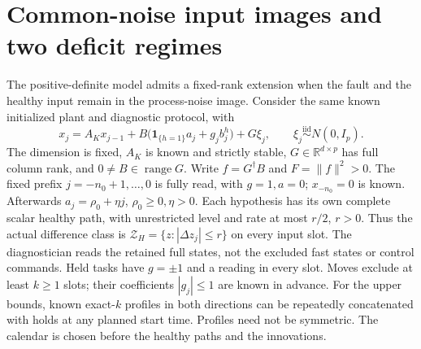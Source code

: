 \section{Common-noise input images and two deficit regimes}
\label{m2sreg:section}

The positive-definite model admits a fixed-rank extension when the fault
and the healthy input remain in the process-noise image. Consider the
same known initialized plant and diagnostic protocol, with
\begin{equation}\label{m2sreg:plant}
x_j=A_Kx_{j-1}+B\bigl(\mathbf1_{\{h=1\}}a_j+g_jb_j^h\bigr)+G\xi_j,
\qquad \xi_j\overset{\mathrm{iid}}{\sim}N(0,I_p).
\end{equation}
The dimension is fixed, $A_K$ is known and strictly stable,
$G\in\mathbb R^{d\times p}$ has full column rank, and
$0\ne B\in\operatorname{range}G$. Write
$f=G^\dagger B$ and $F=\|f\|^2>0$.
The fixed prefix $j=-n_0+1,\ldots,0$ is fully read, with $g=1,a=0$;
$x_{-n_0}=0$ is known. Afterwards $a_j=\rho_0+\eta j$,
$\rho_0\ge0,\eta>0$. Each hypothesis has its own complete scalar
healthy path, with unrestricted level and rate at most $r/2$, $r>0$.
Thus the actual difference class is
$\mathcal Z_H=\{z:|\Delta z_j|\le r\}$ on every input slot.
The diagnostician reads the retained full states, not the excluded fast
states or control commands. Held tasks have $g=\pm1$ and a reading in
every slot. Moves exclude at least $k\ge1$ slots; their coefficients
$|g_j|\le1$ are known in advance. For the upper bounds, known
exact-$k$ profiles in both directions can be repeatedly concatenated
with holds at any planned start time. Profiles need not be symmetric.
The calendar is chosen before the healthy paths and the innovations.

